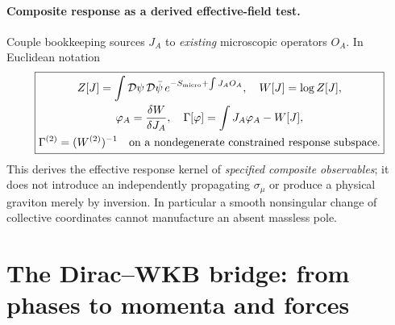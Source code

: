 \documentclass[11pt,a4paper]{article}
\begin{document}
\paragraph{Composite response as a derived effective-field test.}
Couple bookkeeping sources $J_A$ to \emph{existing} microscopic
operators $O_A$.  In Euclidean notation
\begin{equation}\label{eq:qgd075-legendre}
 \boxed{\begin{gathered}
 Z[J]=\int\mathcal D\psi\,\mathcal D\bar\psi\,
 e^{-S_{\rm micro}+\int J_AO_A},\quad W[J]=\log Z[J],\\
 \varphi_A=\frac{\delta W}{\delta J_A},\quad
 \Gamma[\varphi]=\int J_A\varphi_A-W[J],\\
 \Gamma^{(2)}=(W^{(2)})^{-1}
 \quad\text{on a nondegenerate constrained response subspace}.
 \end{gathered}}
\end{equation}
This derives the effective response kernel of \emph{specified
composite observables}; it does not introduce an independently
propagating $\sigma_\mu$ or produce a physical graviton merely by
inversion. In particular a smooth nonsingular change of collective
coordinates cannot manufacture an absent massless pole.


\section{The Dirac--WKB bridge: from phases to momenta and forces}\label{sec:wkb}
\end{document}

